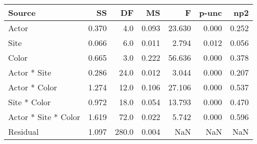 \begin{tabular}{lrrrrrr}
\toprule
               Source &     SS &     DF &     MS &       F &  p-unc &    np2 \\
\midrule
                Actor &  0.370 &    4.0 &  0.093 &  23.630 &  0.000 &  0.252 \\
                 Site &  0.066 &    6.0 &  0.011 &   2.794 &  0.012 &  0.056 \\
                Color &  0.665 &    3.0 &  0.222 &  56.636 &  0.000 &  0.378 \\
         Actor * Site &  0.286 &   24.0 &  0.012 &   3.044 &  0.000 &  0.207 \\
        Actor * Color &  1.274 &   12.0 &  0.106 &  27.106 &  0.000 &  0.537 \\
         Site * Color &  0.972 &   18.0 &  0.054 &  13.793 &  0.000 &  0.470 \\
 Actor * Site * Color &  1.619 &   72.0 &  0.022 &   5.742 &  0.000 &  0.596 \\
             Residual &  1.097 &  280.0 &  0.004 &     NaN &    NaN &    NaN \\
\bottomrule
\end{tabular}
